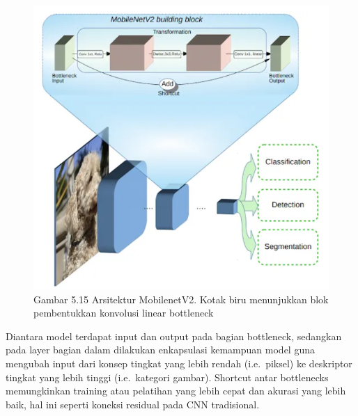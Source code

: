 \documentclass[
  letterpaper,
  DIV=11,
  numbers=noendperiod]{scrreprt}
\begin{document}
\begin{figure}

{\centering \includegraphics{Asset/mobilenetv2.png}

}

\caption{Gambar 5.15 Arsitektur MobilenetV2. Kotak biru menunjukkan blok
pembentukkan konvolusi linear bottleneck}

\end{figure}

Diantara model terdapat input dan output pada bagian bottleneck,
sedangkan pada layer bagian dalam dilakukan enkapsulasi kemampuan model
guna mengubah input dari konsep tingkat yang lebih rendah (i.e.~piksel)
ke deskriptor tingkat yang lebih tinggi (i.e.~kategori gambar). Shortcut
antar bottlenecks memungkinkan training atau pelatihan yang lebih cepat
dan akurasi yang lebih baik, hal ini seperti koneksi residual pada CNN
tradisional.
\end{document}
